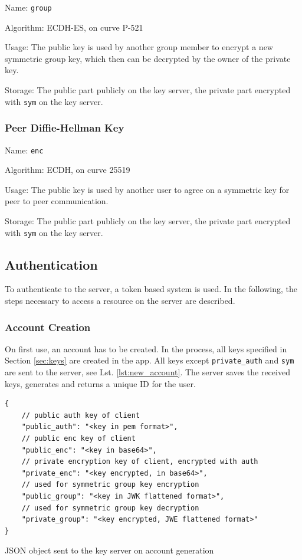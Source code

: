 \documentclass[a4paper, oneside]{discothesis}
\begin{document}
Name: \texttt{group}

\noindent
Algorithm: ECDH-ES, on curve P-521

\noindent
Usage: The public key is used by another group member to encrypt a new symmetric group key, which then can be decrypted by the owner of the private key.

\noindent
Storage: The public part publicly on the key server, the private part encrypted with \texttt{sym} on the key server.

\subsubsection{Peer Diffie-Hellman Key}

Name: \texttt{enc}

\noindent
Algorithm: ECDH, on curve 25519

\noindent
Usage: The public key is used by another user to agree on a symmetric key for peer to peer communication.

\noindent
Storage: The public part publicly on the key server, the private part encrypted with \texttt{sym} on the key server.

\subsection{Authentication}

To authenticate to the server, a token based system is used. In the following, the steps necessary to access a resource on the server are described.

\subsubsection{Account Creation}

On first use, an account has to be created. In the process, all keys specified in Section \ref{sec:keys} are created in the app. All keys except \texttt{private\_auth} and \texttt{sym} are sent to the server, see Lst. \ref{lst:new_account}. The server saves the received keys, generates and returns a unique ID for the user.

\begin{listing}[h!]
\label{lst:new_account}
\begin{verbatim}
{
    // public auth key of client
    "public_auth": "<key in pem format>",
    // public enc key of client
    "public_enc": "<key in base64>",
    // private encryption key of client, encrypted with auth
    "private_enc": "<key encrypted, in base64>",
    // used for symmetric group key encryption
    "public_group": "<key in JWK flattened format>",
    // used for symmetric group key decryption
    "private_group": "<key encrypted, JWE flattened format>" 
}
\end{verbatim}
\caption{JSON object sent to the key server on account generation}
\end{listing}
\end{document}
